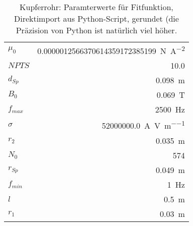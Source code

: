 \begin{table}
    \centering
    \caption{Kupferrohr: Paramterwerte f\"ur Fitfunktion, Direktimport aus Python-Script, gerundet (die Pr\"azision von Python ist nat\"urlich viel h\"oher.}
    \label{tab:fitparams:cu:freq:exact}
    \begin{tabular}{%
        l
        r
    }
    \toprule
        $\mu_0$     & \SI{0.0000012566370614359172385199}{\newton\per\ampere\squared} \\
        $NPTS$      & \num{10.0}                                                      \\
        $d_{Sp}$    & \SI{0.098}{\meter}                                              \\
        $B_0$       & \SI{0.069}{\tesla}                                              \\
        $f_{max}$   & \SI{2500}{\hertz}                                               \\
        $\sigma$    & \SI{52000000.0}{\ampere\per\volt\per\meter}                     \\
        $r_2$       & \SI{0.035}{\meter}                                              \\
        $N_0$       & \num{574}                                                       \\
        $r_{Sp}$    & \SI{0.049}{\meter}                                              \\
        $f_{min}$   & \SI{1}{\hertz}                                                  \\
        $l$         & \SI{0.5}{\meter}                                                \\
        $r_1$       & \SI{0.03}{\meter}                                               \\
    \bottomrule
    \end{tabular}
\end{table}
